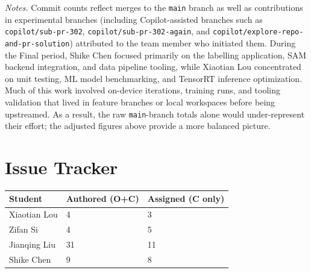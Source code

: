 \documentclass{article}
\begin{document}
\noindent\textit{Notes.} Commit counts reflect merges to the \texttt{main} branch as well as contributions in experimental branches (including Copilot-assisted branches such as \texttt{copilot/sub-pr-302}, \texttt{copilot/sub-pr-302-again}, and \texttt{copilot/explore-repo-and-pr-solution}) attributed to the team member who initiated them. During the Final period, Shike Chen focused primarily on the labelling application, SAM backend integration, and data pipeline tooling, while Xiaotian Lou concentrated on unit testing, ML model benchmarking, and TensorRT inference optimization. Much of this work involved on-device iterations, training runs, and tooling validation that lived in feature branches or local workspaces before being upstreamed. As a result, the raw \texttt{main}-branch totals alone would under-represent their effort; the adjusted figures above provide a more balanced picture.

\section{Issue Tracker}


\begin{table}[H]
  \centering
  \begin{tabular}{lll}
    \toprule
    \textbf{Student} & \textbf{Authored (O+C)} & \textbf{Assigned (C only)} \\
    \midrule
    Xiaotian Lou     & 4                       & 3                          \\
    Zifan Si         & 4                       & 5                          \\
    Jianqing Liu     & 31                      & 11                         \\
    Shike Chen       & 9                       & 8                          \\
    \bottomrule
  \end{tabular}
\end{table}
\end{document}
